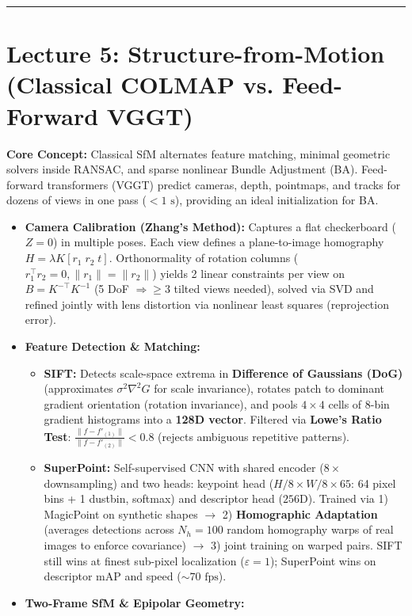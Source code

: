 \documentclass[10pt, a4paper]{article}
\newcommand{\hr}{\vspace{0.8em}\hrule\vspace{0.8em}}
\begin{document}
\hr
\section*{\textcolor{primary}{Lecture 5: Structure-from-Motion (Classical COLMAP vs. Feed-Forward VGGT)}}
\textbf{Core Concept:} Classical SfM alternates feature matching, minimal geometric solvers inside RANSAC, and sparse nonlinear Bundle Adjustment (BA). Feed-forward transformers (VGGT) predict cameras, depth, pointmaps, and tracks for dozens of views in one pass ($<1\text{ s}$), providing an ideal initialization for BA.

\begin{itemize}
    \item \textbf{Camera Calibration (Zhang's Method):} Captures a flat checkerboard ($Z=0$) in multiple poses. Each view defines a plane-to-image homography $H = \lambda K [r_1\; r_2\; t]$. Orthonormality of rotation columns ($r_1^\top r_2 = 0, \|r_1\|=\|r_2\|$) yields 2 linear constraints per view on $B = K^{-\top}K^{-1}$ (5 DoF $\Rightarrow \ge 3$ tilted views needed), solved via SVD and refined jointly with lens distortion via nonlinear least squares (reprojection error).
    \item \textbf{Feature Detection \& Matching:}
    \begin{itemize}
        \item \textbf{SIFT:} Detects scale-space extrema in \textbf{Difference of Gaussians (DoG)} (approximates $\sigma^2\nabla^2 G$ for scale invariance), rotates patch to dominant gradient orientation (rotation invariance), and pools $4\times 4$ cells of 8-bin gradient histograms into a \textbf{128D vector}. Filtered via \textbf{Lowe's Ratio Test}: $\frac{\|f - f'_{(1)}\|}{\|f - f'_{(2)}\|} < 0.8$ (rejects ambiguous repetitive patterns).
        \item \textbf{SuperPoint:} Self-supervised CNN with shared encoder ($8\times$ downsampling) and two heads: keypoint head ($H/8 \times W/8 \times 65$: 64 pixel bins + 1 dustbin, softmax) and descriptor head ($256\text{D}$). Trained via 1) MagicPoint on synthetic shapes $\rightarrow$ 2) \textbf{Homographic Adaptation} (averages detections across $N_h=100$ random homography warps of real images to enforce covariance) $\rightarrow$ 3) joint training on warped pairs. SIFT still wins at finest sub-pixel localization ($\varepsilon=1$); SuperPoint wins on descriptor mAP and speed ($\sim 70\text{ fps}$).
    \end{itemize}
    \item \textbf{Two-Frame SfM \& Epipolar Geometry:}

\end{itemize}
\end{document}
